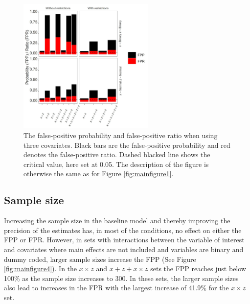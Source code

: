 \begin{figure}[hbt!]
\includegraphics[width=0.6\textwidth]{R/Analysis/Result/Figures/Figure1C.jpeg}
\centering
\caption{The false-positive probability and false-positive ratio when using three covariates. Black bars are the false-positive probability and red denotes the false-positive ratio. Dashed blacked line shows the critical value, here set at 0.05. The description of the figure is otherwise the same as for Figure \ref{fig:mainfigure1}.}
\label{fig:mainfigure2}
\end{figure}

\subsection{Sample size}
Increasing the sample size in the baseline model and thereby improving the precision of the estimates has, in most of the conditions, no effect on either the FPP or FPR. However, in sets with interactions between the variable of interest and covariates where main effects are not included and variables are binary and dummy coded, larger sample sizes increase the FPP (See Figure \ref{fig:mainfigure4}). In the $x \times z$ and $x + z+ x \times z$ sets the FPP reaches just below 100\% as the sample size increases to 300. In these sets, the larger sample sizes also lead to increases in the FPR with the largest increase of 41.9\% for the $x \times z$ set.  


